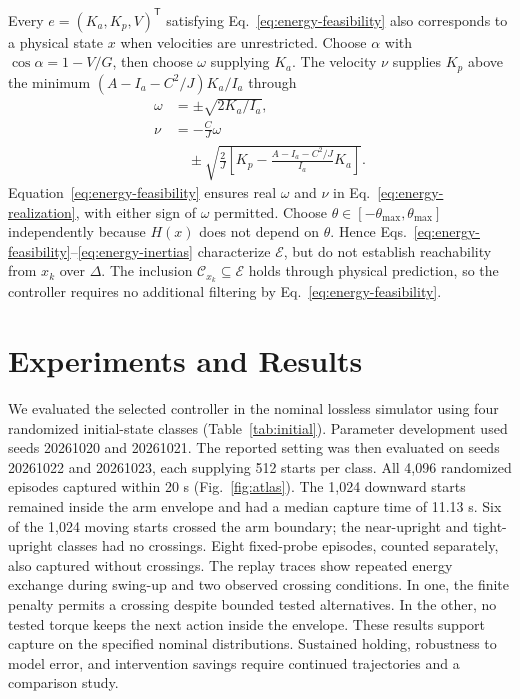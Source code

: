 \documentclass[letterpaper,10pt,conference]{ieeeconf}
\begin{document}
Every $e=(K_a,K_p,V)^{\mathsf T}$ satisfying Eq.~\eqref{eq:energy-feasibility} also corresponds to a physical state $x$ when velocities are unrestricted. Choose $\alpha$ with $\cos\alpha=1-V/G$, then choose $\omega$ supplying $K_a$. The velocity $\nu$ supplies $K_p$ above the minimum $(A-I_a-C^2/J)K_a/I_a$ through
\begin{equation}
\begin{aligned}
 \omega&=\pm\sqrt{2K_a/I_a},\\
 \nu&=-\frac CJ\omega\\
 &\quad\pm\sqrt{\frac2J\left[K_p-\frac{A-I_a-C^2/J}{I_a}K_a\right]}.
\end{aligned}
\label{eq:energy-realization}
\end{equation}
Equation~\eqref{eq:energy-feasibility} ensures real $\omega$ and $\nu$ in Eq.~\eqref{eq:energy-realization}, with either sign of $\omega$ permitted. Choose $\theta\in[-\theta_{\max},\theta_{\max}]$ independently because $H(x)$ does not depend on $\theta$. Hence Eqs.~\eqref{eq:energy-feasibility}--\eqref{eq:energy-inertias} characterize $\mathcal E$, but do not establish reachability from $x_k$ over $\Delta$. The inclusion $\mathcal C_{x_k}\subseteq\mathcal E$ holds through physical prediction, so the controller requires no additional filtering by Eq.~\eqref{eq:energy-feasibility}.


\section{Experiments and Results}
We evaluated the selected controller in the nominal lossless simulator using four randomized initial-state classes (Table~\ref{tab:initial}). Parameter development used seeds 20261020 and 20261021. The reported setting was then evaluated on seeds 20261022 and 20261023, each supplying 512 starts per class. All 4,096 randomized episodes captured within 20 s (Fig.~\ref{fig:atlas}). The 1,024 downward starts remained inside the arm envelope and had a median capture time of 11.13 s. Six of the 1,024 moving starts crossed the arm boundary; the near-upright and tight-upright classes had no crossings. Eight fixed-probe episodes, counted separately, also captured without crossings. The replay traces show repeated energy exchange during swing-up and two observed crossing conditions. In one, the finite penalty permits a crossing despite bounded tested alternatives. In the other, no tested torque keeps the next action inside the envelope. These results support capture on the specified nominal distributions. Sustained holding, robustness to model error, and intervention savings require continued trajectories and a comparison study.
\end{document}
